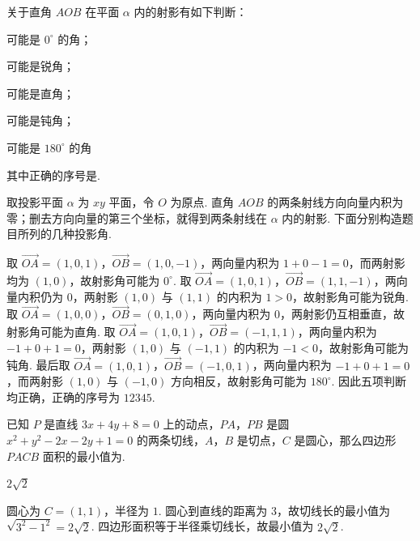 \begin{problem}
关于直角 \(AOB\) 在平面 \(\alpha\) 内的射影有如下判断：

\begin{circlelist}
\item 可能是 \(0^{\circ}\) 的角；
\item 可能是锐角；
\item 可能是直角；
\item 可能是钝角；
\item 可能是 \(180^{\circ}\) 的角
\end{circlelist}

其中正确的序号是\fillinblank{}.


\begin{solution}
取投影平面 \(\alpha\) 为 \(xy\) 平面，令 \(O\) 为原点. 直角 \(AOB\) 的两条射线方向向量内积为零；删去方向向量的第三个坐标，就得到两条射线在 \(\alpha\) 内的射影. 下面分别构造题目所列的几种投影角.

取 \(\overrightarrow{OA}=(1,0,1)\)，\(\overrightarrow{OB}=(1,0,-1)\)，两向量内积为 \(1+0-1=0\)，而两射影均为 \((1,0)\)，故射影角可能为 \(0^{\circ}\). 取 \(\overrightarrow{OA}=(1,0,1)\)，\(\overrightarrow{OB}=(1,1,-1)\)，两向量内积仍为 \(0\)，两射影 \((1,0)\) 与 \((1,1)\) 的内积为 \(1>0\)，故射影角可能为锐角. 取 \(\overrightarrow{OA}=(1,0,0)\)，\(\overrightarrow{OB}=(0,1,0)\)，两向量内积为 \(0\)，两射影仍互相垂直，故射影角可能为直角. 取 \(\overrightarrow{OA}=(1,0,1)\)，\(\overrightarrow{OB}=(-1,1,1)\)，两向量内积为 \(-1+0+1=0\)，两射影 \((1,0)\) 与 \((-1,1)\) 的内积为 \(-1<0\)，故射影角可能为钝角. 最后取 \(\overrightarrow{OA}=(1,0,1)\)，\(\overrightarrow{OB}=(-1,0,1)\)，两向量内积为 \(-1+0+1=0\)，而两射影 \((1,0)\) 与 \((-1,0)\) 方向相反，故射影角可能为 \(180^{\circ}\). 因此五项判断均正确，正确的序号为 \(12345\).
\end{solution}
\end{problem}

\begin{problem}
已知 \(P\) 是直线 \(3x+4y+8=0\) 上的动点，\(PA\)，\(PB\) 是圆 \(x^{2}+y^{2}-2x-2y+1=0\) 的两条切线，\(A\)，\(B\) 是切点，\(C\) 是圆心，那么四边形 \(PACB\) 面积的最小值为\fillinblank{}.

\begin{answer}
\(2\sqrt2\)
\end{answer}

\begin{solution}
圆心为 \(C=(1,1)\)，半径为 \(1\). 圆心到直线的距离为 \(3\)，故切线长的最小值为 \(\sqrt{3^{2}-1^{2}}=2\sqrt2\). 四边形面积等于半径乘切线长，故最小值为 \(2\sqrt2\).
\end{solution}
\end{problem}

